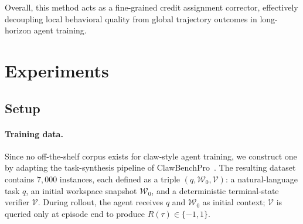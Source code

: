 \documentclass[letterpaper]{article} %
\begin{document}
Overall, this method acts as a fine-grained credit assignment corrector, effectively decoupling local behavioral quality from global trajectory outcomes in long-horizon agent training.

\section{Experiments}
\label{sec:experiments}

\subsection{Setup}
\paragraph{Training data.}
Since no off-the-shelf corpus exists for claw-style agent training, we construct one by adapting the task-synthesis pipeline of ClawBenchPro~\citep{clawbenchpro}. 
The resulting dataset contains $7{,}000$ instances, each defined as a triple $(q, \mathcal{W}_0, \mathcal{V})$: a natural-language task $q$, an initial workspace snapshot $\mathcal{W}_0$, and a deterministic terminal-state verifier $\mathcal{V}$.
During rollout, the agent receives $q$ and $\mathcal{W}_0$ as initial context; $\mathcal{V}$ is queried only at episode end to produce $R(\tau)\in\{-1,1\}$.
\end{document}
